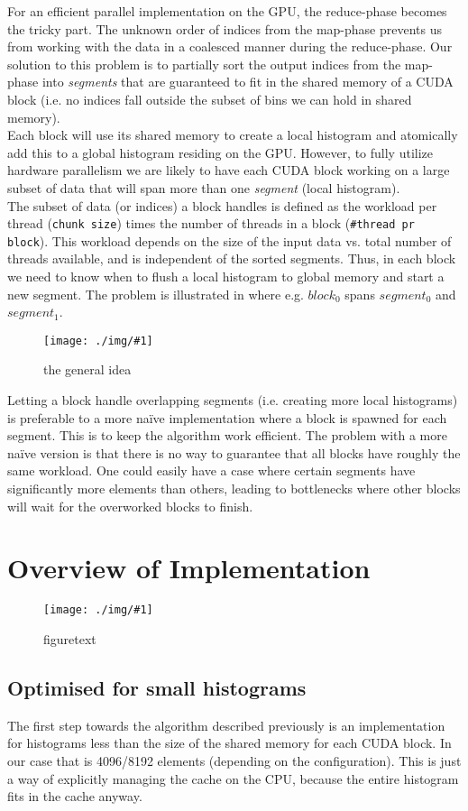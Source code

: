 \documentclass[12pt, a4paper, hidelinks]{article}
\newcommand{\fig}[3]{
\begin{figure}[h]
  \begin{center}
    \texttt{[image: ./img/\#1]}
  \end{center}
  \caption{#3}
  \label{fig:#1}
\end{figure}
}
\renewcommand{\tt}[1]{\texttt{#1}}
\renewcommand{\it}[1]{\textit{#1}}
\begin{document}
For an efficient parallel implementation on the GPU,
the reduce-phase becomes the tricky part.
The unknown order of indices from the map-phase
prevents us from working with the data in a coalesced manner during the reduce-phase.
Our solution to this problem is to partially sort the output indices from
the map-phase into \it{segments} that are guaranteed to fit in the
shared memory of a CUDA block (i.e. no indices fall outside the subset of bins
we can hold in shared memory).\\
Each block will use its shared memory to create a local histogram
and atomically add this to a global histogram residing on the GPU.
However, to fully utilize hardware parallelism we are likely to have
each CUDA block working on a large subset of data that will
span more than one \it{segment} (local histogram).\\
The subset of data (or indices) a block handles is defined as the workload per thread
(\tt{chunk size}) times the number of threads in a block (\tt{#thread pr block}).
This workload depends on the size of the input data vs.
total number of threads available, and is independent of the sorted segments.
Thus, in each block we need to know when to flush a local histogram to global
memory and start a new segment.
The problem is illustrated in  where e.g.
$block_0$ spans $segment_0$ and $segment_1$.

\fig{overview}{140}{the general idea}

Letting a block handle overlapping segments (i.e. creating more local histograms)
is preferable to a more naïve implementation where a block is spawned
for each segment. This is to keep the algorithm work efficient.
The problem with a more naïve version is that there is no way
to guarantee that all blocks have roughly the same workload.
One could easily have a case where certain segments have significantly
more elements than others, leading to bottlenecks where other blocks will
wait for the overworked blocks to finish.

\section{Overview of Implementation}
\fig{device-dia}{140}{figuretext}

\subsection{Optimised for small histograms}
The first step towards the algorithm described previously is an implementation
for histograms less than the size of the shared memory for each CUDA block.
In our case that is 4096/8192 elements (depending on the configuration).
This is just a way of explicitly managing the cache on the CPU, because the
entire histogram fits in the cache anyway.
\end{document}
